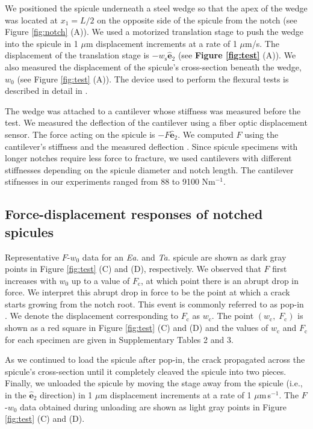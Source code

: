 \documentclass[12pt,onecolumn]{article}
\makeatletter
\newcommand{\ey}{\hat{\mathbf{e}}_2}
\newcommand{\TA}{\textit{Ta.\@}\xspace}
\newcommand{\EA}{\textit{Ea.\@}\xspace}
\makeatother
\begin{document}
We positioned the spicule underneath a steel wedge so that the apex of the wedge was located at $x_1=L/2$ on the opposite side of the spicule from the notch (see Figure \ref{fig:notch} (A)). We used a motorized translation stage to push the wedge into the spicule in 1 $\mu$m displacement increments at a rate of 1 $\mu$m/s. The displacement of the translation stage is $-w_\mathrm{s}\ey$ (see {\bf Figure \ref{fig:test}} (A)). We also measured the displacement of the spicule's cross-section beneath the wedge, $w_0$ (see Figure \ref{fig:test} (A)). The device used to perform the flexural tests is described in detail in \cite{monn2017enhanced,monn2017millimeter}.

The wedge was attached to a cantilever whose stiffness was measured before the test. We measured the deflection of the cantilever using a fiber optic displacement sensor. The force acting on the spicule is $-F\ey$. We computed $F$ using the cantilever's stiffness and the measured deflection \cite{monn2017enhanced}. Since spicule specimens with longer notches require less force to fracture, we used cantilevers with different stiffnesses depending on the spicule diameter and notch length. The cantilever stifnesses in our experiments ranged from 88 to 9100 Nm$^{-1}$.

\subsection*{Force-displacement responses of notched spicules}
\label{sec:fdresp}
Representative $F$-$w_0$ data for an \EA and \TA spicule are shown as dark gray points in Figure \ref{fig:test} (C) and (D), respectively. We observed that $F$ first increases with $w_0$ up to a value of $F_\mathrm{c}$, at which point there is an abrupt drop in force. We interpret this abrupt drop in force to be the point at which a crack starts growing from the notch root. This event is commonly referred to as pop-in \cite{paris1965fracture,jaya2014crack}. We denote the displacement corresponding to $F_\mathrm{c}$ as $w_\mathrm{c}$. The point $(w_\mathrm{c}, \; F_\mathrm{c})$ is shown as a red square in Figure \ref{fig:test} (C) and (D) and the values of $w_\mathrm{c}$ and $F_\mathrm{c}$ for each specimen are given in Supplementary Tables 2 and 3. 

As we continued to load the spicule after pop-in, the crack propagated across the spicule's cross-section until it completely cleaved the spicule into two pieces. Finally, we unloaded the spicule by moving the stage away from the spicule (i.e., in the $\ey$ direction) in 1 $\mu$m displacement increments at a rate of 1 $\mu$m\,s$^{-1}$. The $F$-$w_0$ data obtained during unloading are shown as light gray points in Figure \ref{fig:test} (C) and (D).
\end{document}
